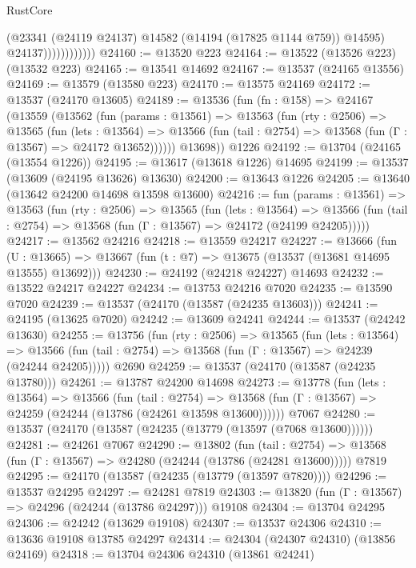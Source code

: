 \begin{lexlean}{RustCore}
\begin{coremodule}
                            (@23341 (@24119 @24137) @14582 (@14194 (@17825 @1144 @759)) @14595)
                            @24137))))))))))))
@24160 := @13520 @223
@24164 := @13522 (@13526 @223) (@13532 @223)
@24165 := @13541 @14692
@24167 := @13537 (@24165 @13556)
@24169 := @13579 (@13580 @223)
@24170 := @13575 @24169
@24172 := @13537 (@24170 @13605)
@24189 := @13536
    (fun (fn : @158) =>
    @24167
      (@13559
        (@13562
          (fun (params : @13561) =>
          @13563
            (fun (rty : @2506) =>
            @13565
              (fun (lets : @13564) =>
              @13566 (fun (tail : @2754) => @13568 (fun (Γ : @13567) => @24172 @13652))))))
        @13698))
    @1226
@24192 := @13704 (@24165 (@13554 @1226))
@24195 := @13617 (@13618 @1226) @14695
@24199 := @13537 (@13609 (@24195 @13626) @13630)
@24200 := @13643 @1226
@24205 := @13640 (@13642 @24200 @14698 @13598 @13600)
@24216 := fun (params : @13561) =>
  @13563
    (fun (rty : @2506) =>
    @13565
      (fun (lets : @13564) =>
      @13566 (fun (tail : @2754) => @13568 (fun (Γ : @13567) => @24172 (@24199 @24205)))))
@24217 := @13562 @24216
@24218 := @13559 @24217
@24227 := @13666
    (fun (U : @13665) => @13667 (fun (t : @7) => @13675 (@13537 (@13681 @14695 @13555) @13692)))
@24230 := @24192 (@24218 @24227) @14693
@24232 := @13522 @24217 @24227
@24234 := @13753 @24216 @7020
@24235 := @13590 @7020
@24239 := @13537 (@24170 (@13587 (@24235 @13603)))
@24241 := @24195 (@13625 @7020)
@24242 := @13609 @24241
@24244 := @13537 (@24242 @13630)
@24255 := @13756
    (fun (rty : @2506) =>
    @13565
      (fun (lets : @13564) =>
      @13566 (fun (tail : @2754) => @13568 (fun (Γ : @13567) => @24239 (@24244 @24205)))))
    @2690
@24259 := @13537 (@24170 (@13587 (@24235 @13780)))
@24261 := @13787 @24200 @14698
@24273 := @13778
    (fun (lets : @13564) =>
    @13566
      (fun (tail : @2754) =>
      @13568 (fun (Γ : @13567) => @24259 (@24244 (@13786 (@24261 @13598 @13600))))))
    @7067
@24280 := @13537 (@24170 (@13587 (@24235 (@13779 (@13597 (@7068 @13600))))))
@24281 := @24261 @7067
@24290 := @13802
    (fun (tail : @2754) => @13568 (fun (Γ : @13567) => @24280 (@24244 (@13786 (@24281 @13600)))))
    @7819
@24295 := @24170 (@13587 (@24235 (@13779 (@13597 @7820))))
@24296 := @13537 @24295
@24297 := @24281 @7819
@24303 := @13820 (fun (Γ : @13567) => @24296 (@24244 (@13786 @24297))) @19108
@24304 := @13704 @24295
@24306 := @24242 (@13629 @19108)
@24307 := @13537 @24306
@24310 := @13636 @19108 @13785 @24297
@24314 := @24304 (@24307 @24310) (@13856 @24169)
@24318 := @13704 @24306 @24310 (@13861 @24241)

\end{coremodule}
\end{lexlean}
